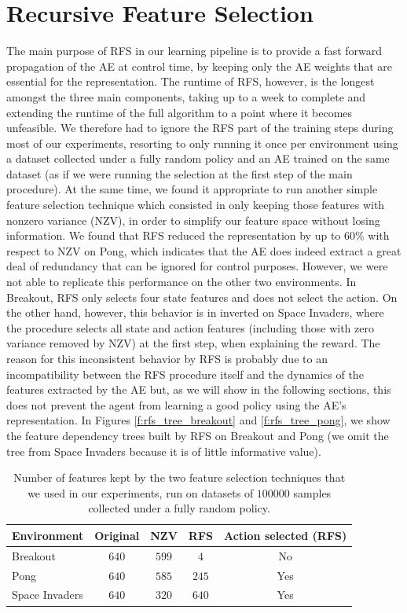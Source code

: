 \section{Recursive Feature Selection}
The main purpose of RFS in our learning pipeline is to provide a fast forward 
propagation of the AE at control time, by keeping only the AE weights that are 
essential for the representation. 
The runtime of RFS, however, is the longest amongst the three main components, 
taking up to a week to complete and extending the runtime of the full algorithm
to a point where it becomes unfeasible. We therefore had to ignore the RFS 
part of the training steps during most of our experiments, resorting to only
running it once per environment using a dataset collected under a fully random 
policy and an AE trained on the same dataset (as if we were running the 
selection at the first step of the main procedure). 
At the same time, we found it appropriate to run another simple feature 
selection technique which consisted in only keeping those features with nonzero 
variance (NZV), in order to simplify our feature space without losing 
information. 
We found that RFS reduced the representation by up to $60\%$ with respect to NZV
on Pong, which indicates that the AE does indeed extract a great deal of 
redundancy that can be ignored for control purposes. 
However, we were not able to replicate this performance on the other two 
environments.
In Breakout, RFS only selects four state features and does not select the action. 
On the other hand, however, this behavior is in inverted on Space Invaders, 
where the procedure selects all state and action features (including those with
zero variance removed by NZV) at the first step, when explaining the reward. 
The reason for this inconsistent behavior by RFS is probably due to an 
incompatibility between the RFS procedure itself and the dynamics of the 
features extracted by the AE but, as we will show in the following sections,
this does not prevent the agent from learning a good policy using the 
AE's representation.
In Figures \ref{f:rfs_tree_breakout} and \ref{f:rfs_tree_pong}, we show the 
feature dependency trees built by RFS on Breakout and Pong (we omit the tree
from Space Invaders because it is of little informative value).
%
\begin{table}
    \centering
    \begin{tabular}{l c c c c} 
	\hline
	Environment    & Original & NZV   & RFS   & Action selected (RFS) \\ 
	\hline 
	Breakout       & $640$    & $599$ & $4$   & No                    \\
	Pong           & $640$    & $585$ & $245$ & Yes                   \\
	Space Invaders & $640$    & $320$ & $640$ & Yes                   \\
	\hline
    \end{tabular}
    \caption[Feature selection results]{Number of features kept by the two 
	     feature selection techniques that we used in our experiments, run 
	     on datasets of $100000$ samples collected under a fully random 
	     policy.}
    \label{t:RFS_results}
\end{table}
